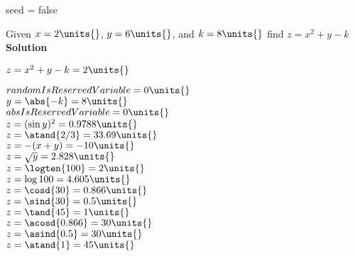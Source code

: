 seed = false

\question Given \mbox{$x = \mbox{$2 \units{ }$}$}, \mbox{$y = \mbox{$6 \units{ }$}$}, and \mbox{$k = \mbox{$8 \units{ }$}$} find $z = x^2+y-k$\\

\textbf{Solution}

\mbox{$z=x^2+y-k  = \mbox{$2 \units{ }$}$}\\ 

\mbox{$randomIsReservedVariable  = \mbox{$0 \units{ }$}$}\\
\mbox{$y = \abs{-k}  = \mbox{$8 \units{ }$}$}\\
\mbox{$absIsReservedVariable  = \mbox{$0 \units{ }$}$}\\
\mbox{$z = (\sin{y})^2  = \mbox{$0.9788 \units{ }$}$}\\
\mbox{$z = \atand{2/3}   = \mbox{$33.69 \units{ }$}$}\\
\mbox{$z = -(x+y)  = \mbox{$-10 \units{ }$}$}\\
\mbox{$z=\sqrt{y}  = \mbox{$2.828 \units{ }$}$}\\
\mbox{$z = \logten{100}  = \mbox{$2 \units{ }$}$}\\
\mbox{$z = \log{100}  = \mbox{$4.605 \units{ }$}$}\\
\mbox{$z = \cosd{30}  = \mbox{$0.866 \units{ }$}$}\\
\mbox{$z = \sind{30}  = \mbox{$0.5 \units{ }$}$}\\
\mbox{$z = \tand{45}  = \mbox{$1 \units{ }$}$}\\
\mbox{$z = \acosd{0.866}  = \mbox{$30 \units{ }$}$}\\
\mbox{$z = \asind{0.5}  = \mbox{$30 \units{ }$}$}\\
\mbox{$z = \atand{1}  = \mbox{$45 \units{ }$}$}\\
